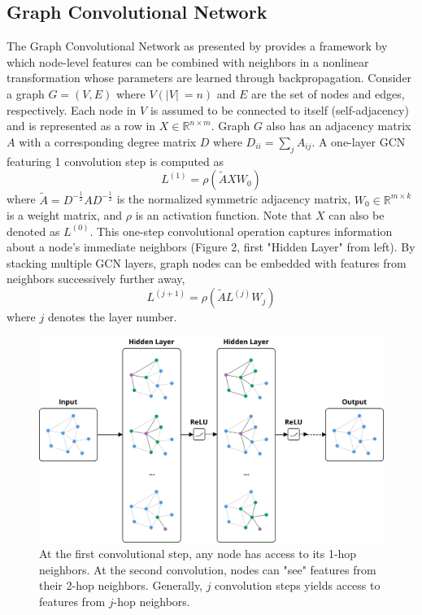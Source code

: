 \documentclass{article}
\begin{document}
\subsection{Graph Convolutional Network}
The Graph Convolutional Network as presented by \cite{kipf2016semisupervised} provides a framework by which node-level features can be combined with neighbors in a nonlinear transformation whose parameters are learned through backpropagation. Consider a graph $G = (V,E)$ where $V(\lvert V\rvert\ = n)$ and $E$ are the set of nodes and edges, respectively. Each node in $V$ is assumed to be connected to itself (self-adjacency) and is represented as a row in $X \in \mathbb{R}^{n \times m}$. Graph $G$ also has an adjacency matrix $A$ with a corresponding degree matrix $D$ where $D_{ii} = \sum_{j}A_{ij}$. A one-layer GCN featuring 1 convolution step is computed as
\begin{equation}
L^{(1)} = \rho(\widetilde{A}XW_{0})
\end{equation}
where $\widetilde{A} = D^{-\frac{1}{2}}AD^{-\frac{1}{2}}$ is the normalized symmetric adjacency matrix, $W_0 \in \mathbb{R}^{m \times k}$ is a weight matrix, and $\rho$ is an activation function. Note that $X$ can also be denoted as $L^{(0)}$. This one-step convolutional operation captures information about a node's immediate neighbors (Figure 2, first "Hidden Layer" from left). By stacking multiple GCN layers, graph nodes can be embedded with features from neighbors successively further away,
\begin{equation}
L^{(j+1)} = \rho(\widetilde{A}L^{(j)}W_{j})
\end{equation}
where $j$ denotes the layer number.

\begin{figure}
\centering
\includegraphics[width=.5\linewidth]{gcn_2steps}
\caption{At the first convolutional step, any node has access to its 1-hop neighbors. At the second convolution, nodes can "see" features from their 2-hop neighbors. Generally, $j$ convolution steps yields access to features from $j$-hop neighbors.}
\label{fig: Graph Convolutional Network}
\end{figure}
\end{document}
